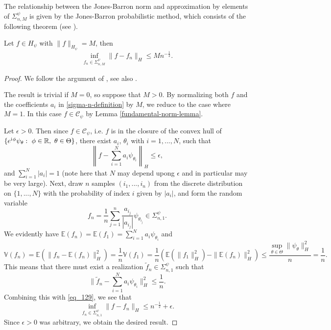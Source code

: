 The relationship between the Jones-Barron norm and approximation by elements of $\Sigma_{n,M}^{\psi}$ is given by the Jones-Barron probabilistic method, which consists of the following theorem (see \cite{barron1993universal,jones1992simple,pisier1981remarques}).

\begin{theorem}\label{jones-barron}
 Let $f\in H_\psi$ with $\|f\|_{H_\psi} = M$, then
 \begin{equation}
  \inf_{f_n\in \Sigma^\psi_{n,M}} \|f-f_n\|_H \leq Mn^{-\frac{1}{2}}.
 \end{equation}

\end{theorem}

\begin{proof}
 We follow the argument of \cite{barron1993universal}, see also \cite{jones1992simple,pisier1981remarques}.
 
 The result is trivial if $M = 0$, so suppose that $M > 0$. By normalizing both $f$ and the coefficients $a_i$ in \eqref{sigma-n-definition} by $M$, we reduce to the case where $M = 1$. In this case $f\in \mathcal{C}_\psi$ by Lemma \ref{fundamental-norm-lemma}.
 
  Let $\epsilon > 0$. Then since $f\in \mathcal{C}_\psi$, i.e. $f$ is in the closure of the convex hull of $\{e^{{\mathrm{i}\mkern1mu}\phi}\psi_\theta:~\phi\in \mathbb{R},~\theta\in\Theta\}$, there exist $a_i$, $\theta_i$ with $i=1,...,N$, such that
 \begin{equation}\label{eq_129}
  \left\|f - \sum_{i=1}^Na_i\psi_{\theta_i}\right\|_H \leq \epsilon,
 \end{equation}
 and $\sum_{i=1}^N |a_i| = 1$ (note here that $N$ may depend upong $\epsilon$ and in particular may be very large). Next, draw $n$ samples $(i_1,...,i_n)$ from the discrete distribution on $\{1,...,N\}$ with the probability of index $i$ given by $|a_i|$, and form the random variable
\begin{equation}
 f_n = \frac{1}{n}\sum_{j=1}^n \frac{a_{i_j}}{|a_{i_j}|}\psi_{\theta_{i_j}} \in \Sigma^\psi_{n,1}.
\end{equation}
We evidently have $\mathbb{E}(f_n) = \mathbb{E}(f_1) = \sum_{i=1}^Na_i\psi_{\theta_i}$ and $$\mathbb{V}(f_n) = \mathbb{E}(\|f_n-\mathbb{E}(f_n)\|_H^2) = \frac{1}{n}\mathbb{V}(f_1) = \frac{1}{n}(\mathbb{E}(\|f_1\|_H^2) - \|\mathbb{E}(f_n)\|_H^2)\leq \frac{\sup_{\theta\in \Theta} \|\psi_\theta\|^2_H}{n} = \frac{1}{n}.$$ 
This means that there must exist a realization $\tilde{f}_n\in \Sigma^\psi_{n,1}$ such that
\begin{equation}
 \|\tilde{f}_n - \sum_{i=1}^Na_i\psi_{\theta_i}\|_H^2 \leq \frac{1}{n}.
\end{equation}
Combining this with \eqref{eq_129}, we see that
\begin{equation}
 \inf_{f_n\in \Sigma^\psi_{n,1}} \|f-f_n\|_H \leq n^{-\frac{1}{2}} + \epsilon.
\end{equation}
Since $\epsilon > 0$ was arbitrary, we obtain the desired result.
\end{proof}